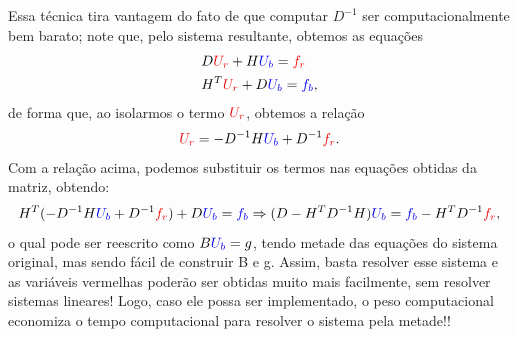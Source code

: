 \documentclass[../differential_methods.tex]{subfiles}
\begin{document}
Essa técnica tira vantagem do fato de que computar \(D^{-1}\) ser computacionalmente bem barato; note que, pelo sistema resultante, obtemos as equações
\begin{align*}
	 & D{\color{Red2}U_{r}}+H{\color{Blue2}U_{b}}={\color{Red2}f_{r}}       \\
	 & H^{T}{\color{Red2}U_{r}}+D{\color{Blue2}U_{b}}={\color{Blue2}f_{b}},
\end{align*}
de forma que, ao isolarmos o termo \({\color{Red2}U_{r}}\), obtemos a relação
\[
	{\color{Red2}U_{r}}=-D^{-1}H{\color{Blue2}U_{b}}+D^{-1}{\color{Red2}f_{r}}.
\]
Com a relação acima, podemos substituir os termos nas equações obtidas da matriz, obtendo:
\[
	H^{T}(-D^{-1}H{\color{Blue2}U_{b}}+D^{-1}{\color{Red2}f_{r}})+D{\color{Blue2}U_{b}}={\color{Blue2}f_{b}} \Rightarrow (D-H^{T}D^{-1}H){\color{Blue2}U_{b}}={\color{Blue2}f_{b}}-H^{T}D^{-1}{\color{Red2}f_{r}},
\]
o qual pode ser reescrito como \(B{\color{Blue2}U_{b}}=g\), tendo metade das equações do sistema original, mas sendo fácil de construir B e g. Assim, basta resolver esse sistema e as variáveis vermelhas poderão ser obtidas muito mais facilmente, sem resolver sistemas lineares! Logo, caso ele possa ser implementado, o peso computacional economiza o tempo computacional para resolver o sistema pela metade!!
\end{document}
